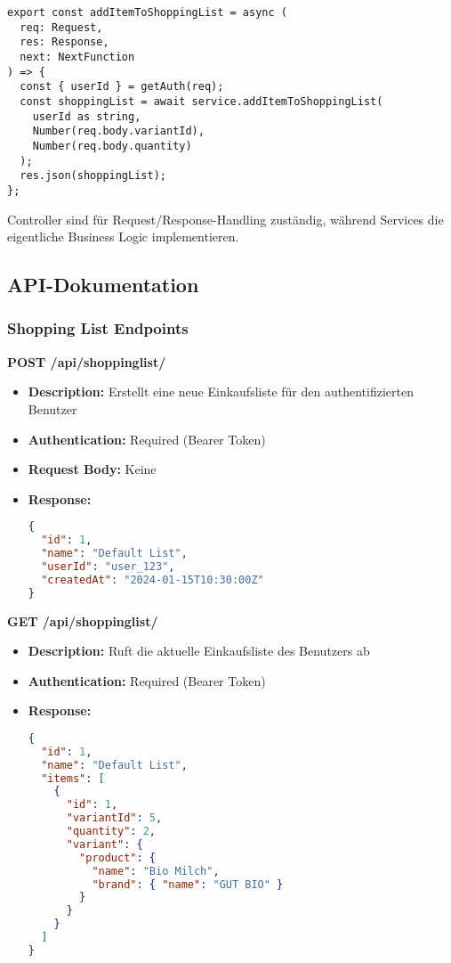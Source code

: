 \begin{lstlisting}[style=typescriptstyle,caption={Controller-Beispiel: Shopping List}]
export const addItemToShoppingList = async (
  req: Request,
  res: Response,
  next: NextFunction
) => {
  const { userId } = getAuth(req);
  const shoppingList = await service.addItemToShoppingList(
    userId as string,
    Number(req.body.variantId),
    Number(req.body.quantity)
  );
  res.json(shoppingList);
};
\end{lstlisting}

Controller sind für Request/Response-Handling zuständig, während Services die eigentliche Business Logic implementieren.

\subsection{API-Dokumentation}

\subsubsection{Shopping List Endpoints}

\textbf{POST /api/shoppinglist/}
\begin{itemize}
    \item \textbf{Description:} Erstellt eine neue Einkaufsliste für den authentifizierten Benutzer
    \item \textbf{Authentication:} Required (Bearer Token)
    \item \textbf{Request Body:} Keine
    \item \textbf{Response:} 
    \begin{lstlisting}[language=JSON]
{
  "id": 1,
  "name": "Default List",
  "userId": "user_123",
  "createdAt": "2024-01-15T10:30:00Z"
}
    \end{lstlisting}
\end{itemize}

\textbf{GET /api/shoppinglist/}
\begin{itemize}
    \item \textbf{Description:} Ruft die aktuelle Einkaufsliste des Benutzers ab
    \item \textbf{Authentication:} Required (Bearer Token)
    \item \textbf{Response:} 
    \begin{lstlisting}[language=JSON]
{
  "id": 1,
  "name": "Default List",
  "items": [
    {
      "id": 1,
      "variantId": 5,
      "quantity": 2,
      "variant": {
        "product": {
          "name": "Bio Milch",
          "brand": { "name": "GUT BIO" }
        }
      }
    }
  ]
}
    \end{lstlisting}
\end{itemize}

